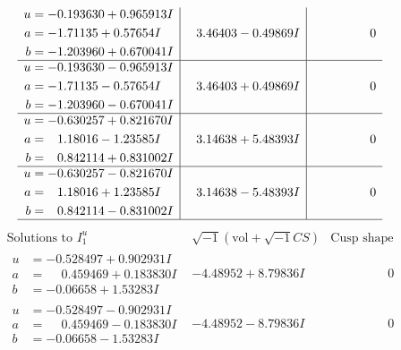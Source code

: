 \documentclass[1p]{elsarticle_modified}
\theoremstyle{definition}
\newcommand{\I}{\sqrt{-1}}
\begin{document}
$$\begin{array}{c|c|c}
\begin{aligned}
u &= -0.193630 + 0.965913 I \\
a &= -1.71135 + 0.57654 I \\
b &= -1.203960 + 0.670041 I\end{aligned}
 & \phantom{-}3.46403 - 0.49869 I & \phantom{-0.000000 } 0 \\ \hline\begin{aligned}
u &= -0.193630 - 0.965913 I \\
a &= -1.71135 - 0.57654 I \\
b &= -1.203960 - 0.670041 I\end{aligned}
 & \phantom{-}3.46403 + 0.49869 I & \phantom{-0.000000 } 0 \\ \hline\begin{aligned}
u &= -0.630257 + 0.821670 I \\
a &= \phantom{-}1.18016 - 1.23585 I \\
b &= \phantom{-}0.842114 + 0.831002 I\end{aligned}
 & \phantom{-}3.14638 + 5.48393 I & \phantom{-0.000000 } 0 \\ \hline\begin{aligned}
u &= -0.630257 - 0.821670 I \\
a &= \phantom{-}1.18016 + 1.23585 I \\
b &= \phantom{-}0.842114 - 0.831002 I\end{aligned}
 & \phantom{-}3.14638 - 5.48393 I & \phantom{-0.000000 } 0\\
 \hline 
 \end{array}$$\newpage$$\begin{array}{c|c|c}  
\text{Solutions to }I^u_{1}& \I (\text{vol} + \sqrt{-1}CS) & \text{Cusp shape}\\
 \hline 
\begin{aligned}
u &= -0.528497 + 0.902931 I \\
a &= \phantom{-}0.459469 + 0.183830 I \\
b &= -0.06658 + 1.53283 I\end{aligned}
 & -4.48952 + 8.79836 I & \phantom{-0.000000 } 0 \\ \hline\begin{aligned}
u &= -0.528497 - 0.902931 I \\
a &= \phantom{-}0.459469 - 0.183830 I \\
b &= -0.06658 - 1.53283 I\end{aligned}
 & -4.48952 - 8.79836 I & \phantom{-0.000000 } 0 \\ \hline\begin{aligned}

\end{aligned}
\end{array}$$
\end{document}
